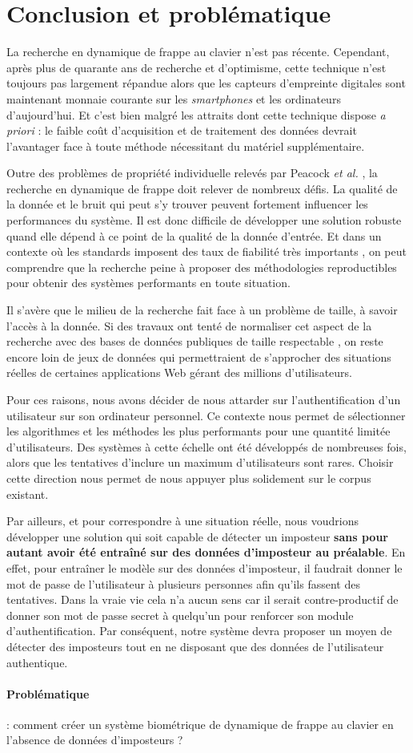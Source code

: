 \section{Conclusion et problématique}

La recherche en dynamique de frappe au clavier n'est pas récente. Cependant, après plus de quarante ans de recherche et d'optimisme, cette technique n'est toujours pas largement répandue alors que les capteurs d'empreinte digitales sont maintenant monnaie courante sur les \textit{smartphones} et les ordinateurs d'aujourd'hui. Et c'est bien malgré les attraits dont cette technique dispose \textit{a priori} : le faible coût d'acquisition et de traitement des données devrait l'avantager face à toute méthode nécessitant du matériel supplémentaire.

Outre des problèmes de propriété individuelle relevés par Peacock \textit{et al.} \cite{peacock2004}, la recherche en dynamique de frappe doit relever de nombreux défis. La qualité de la donnée et le bruit qui peut s'y trouver peuvent fortement influencer les performances du système. Il est donc difficile de développer une solution robuste quand elle dépend à ce point de la qualité de la donnée d'entrée. Et dans un contexte où les standards imposent des taux de fiabilité très importants \cite{killourhy2009}, on peut comprendre que la recherche peine à proposer des méthodologies reproductibles pour obtenir des systèmes performants en toute situation.

Il s'avère que le milieu de la recherche fait face à un problème de taille, à savoir l'accès à la donnée. Si des travaux ont tenté de normaliser cet aspect de la recherche avec des bases de données publiques de taille respectable \cite{giotGREYC,killourhy2009}, on reste encore loin de jeux de données qui permettraient de s'approcher des situations réelles de certaines applications Web gérant des millions d'utilisateurs.

Pour ces raisons, nous avons décider de nous attarder sur l'authentification d'un utilisateur sur son ordinateur personnel. Ce contexte nous permet de sélectionner les algorithmes et les méthodes les plus performants pour une quantité limitée d'utilisateurs. Des systèmes à cette échelle ont été développés de nombreuses fois, alors que les tentatives d'inclure un maximum d'utilisateurs sont rares. Choisir cette direction nous permet de nous appuyer plus solidement sur le corpus existant.

Par ailleurs, et pour correspondre à une situation réelle, nous voudrions développer une solution qui soit capable de détecter un imposteur \textbf{sans pour autant avoir été entraîné sur des données d'imposteur au préalable}. En effet, pour entraîner le modèle sur des données d'imposteur, il faudrait donner le mot de passe de l'utilisateur à plusieurs personnes afin qu'ils fassent des tentatives. Dans la vraie vie cela n'a aucun sens car il serait contre-productif de donner son mot de passe secret à quelqu'un pour renforcer son module d'authentification. Par conséquent, notre système devra proposer un moyen de détecter des imposteurs tout en ne disposant que des données de l'utilisateur authentique.

\paragraph{Problématique} : comment créer un système biométrique de dynamique de frappe au clavier en l'absence de données d'imposteurs ?